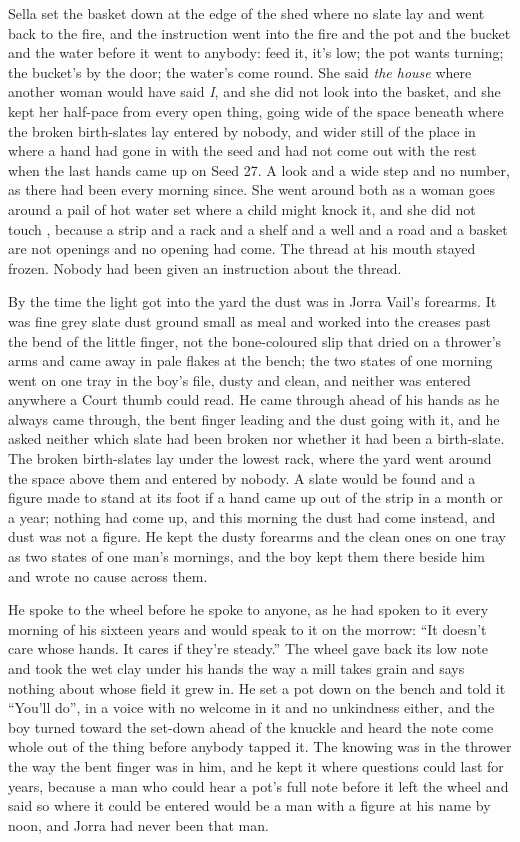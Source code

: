 Sella set the basket down at the edge of the shed where no slate lay and went back to the fire, and the instruction went into the fire and the pot and the bucket and the water before it went to anybody: feed it, it's low; the pot wants turning; the bucket's by the door; the water's come round. She said \emph{the house} where another woman would have said \emph{I}, and she did not look into the basket, and she kept her half-pace from every open thing, going wide of the space beneath  where the broken birth-slates lay entered by nobody, and wider still of the place in  where a hand had gone in with the seed and had not come out with the rest when the last hands came up on Seed 27. A look and a wide step and no number, as there had been every morning since. She went around both as a woman goes around a pail of hot water set where a child might knock it, and she did not touch , because a strip and a rack and a shelf and a well and a road and a basket are not openings and no opening had come. The thread at his mouth stayed frozen. Nobody had been given an instruction about the thread.

By the time the light got into the yard the dust was in Jorra Vail's forearms. It was fine grey slate dust ground small as meal and worked into the creases past the bend of the little finger, not the bone-coloured slip that dried on a thrower's arms and came away in pale flakes at the bench; the two states of one morning went on one tray in the boy's file, dusty and clean, and neither was entered anywhere a Court thumb could read. He came through ahead of his hands as he always came through, the bent finger leading and the dust going with it, and he asked neither which slate had been broken nor whether it had been a birth-slate. The broken birth-slates lay under the lowest rack, where the yard went around the space above them and entered by nobody. A slate would be found and a figure made to stand at its foot if a hand came up out of the strip in a month or a year; nothing had come up, and this morning the dust had come instead, and dust was not a figure. He kept the dusty forearms and the clean ones on one tray as two states of one man's mornings, and the boy kept them there beside him and wrote no cause across them.

He spoke to the wheel before he spoke to anyone, as he had spoken to it every morning of his sixteen years and would speak to it on the morrow: “It doesn't care whose hands. It cares if they're steady.” The wheel gave back its low note and took the wet clay under his hands the way a mill takes grain and says nothing about whose field it grew in. He set a pot down on the bench and told it “You'll do”, in a voice with no welcome in it and no unkindness either, and the boy turned toward the set-down ahead of the knuckle and heard the note come whole out of the thing before anybody tapped it. The knowing was in the thrower the way the bent finger was in him, and he kept it where questions could last for years, because a man who could hear a pot's full note before it left the wheel and said so where it could be entered would be a man with a figure at his name by noon, and Jorra had never been that man.

